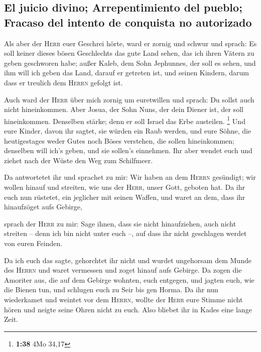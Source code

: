 \hypertarget{el-juicio-divino-arrepentimiento-del-pueblo-fracaso-del-intento-de-conquista-no-autorizado}{%
\subsection{El juicio divino; Arrepentimiento del pueblo; Fracaso del
intento de conquista no
autorizado}\label{el-juicio-divino-arrepentimiento-del-pueblo-fracaso-del-intento-de-conquista-no-autorizado}}

 Als aber der \textsc{Herr} euer Geschrei hörte, ward er
zornig und schwur und sprach:  Es soll keiner dieses
bösen Geschlechts das gute Land sehen, das ich ihren Vätern zu geben
geschworen habe;  außer Kaleb, dem Sohn Jephunnes, der
soll es sehen, und ihm will ich geben das Land, darauf er getreten ist,
und seinen Kindern, darum dass er treulich dem \textsc{Herrn} gefolgt
ist.

 Auch ward der \textsc{Herr} über mich zornig um
euretwillen und sprach: Du sollst auch nicht hineinkommen.
 Aber Josua, der Sohn Nuns, der dein Diener ist, der soll
hineinkommen. Denselben stärke; denn er soll Israel das Erbe austeilen.
\footnote{\textbf{1:38} 4Mo 34,17}  Und eure Kinder,
davon ihr sagtet, sie würden ein Raub werden, und eure Söhne, die
heutigestages weder Gutes noch Böses verstehen, die sollen hineinkommen;
denselben will ich's geben, und sie sollen's einnehmen. 
Ihr aber wendet euch und ziehet nach der Wüste den Weg zum Schilfmeer.

 Da antwortetet ihr und sprachet zu mir: Wir haben an dem
\textsc{Herrn} gesündigt; wir wollen hinauf und streiten, wie uns der
\textsc{Herr}, unser Gott, geboten hat. Da ihr euch nun rüstetet, ein
jeglicher mit seinen Waffen, und waret an dem, dass ihr hinaufzöget aufs
Gebirge,

 sprach der \textsc{Herr} zu mir: Sage ihnen, dass sie
nicht hinaufziehen, auch nicht streiten -- denn ich bin nicht unter euch
--, auf dass ihr nicht geschlagen werdet von euren Feinden.

 Da ich euch das sagte, gehorchtet ihr nicht und wurdet
ungehorsam dem Munde des \textsc{Herrn} und waret vermessen und zoget
hinauf aufs Gebirge.  Da zogen die Amoriter aus, die auf
dem Gebirge wohnten, euch entgegen, und jagten euch, wie die Bienen tun,
und schlugen euch zu Seir bis gen Horma.  Da ihr nun
wiederkamet und weintet vor dem \textsc{Herrn}, wollte der \textsc{Herr}
eure Stimme nicht hören und neigte seine Ohren nicht zu euch.
 Also bliebet ihr in Kades eine lange Zeit.

